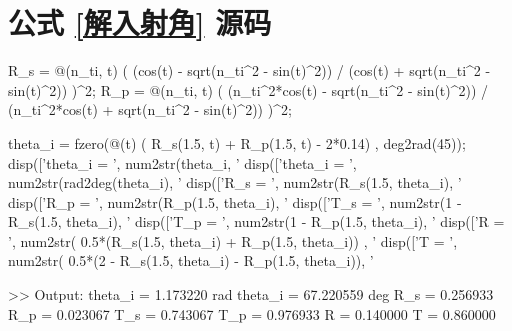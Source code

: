 \documentclass[UTF8]{report}
\theoremstyle{MyLineTheoremStyle} %
\theoremstyle{MyBlockTheoremStyle} %
\theoremstyle{MySubsubsectionStyle} %
\begin{document}
\section{公式 \ref{解入射角} 源码}\label{公式解入射角源码}

\begin{matlablisting}
R_s = @(n_ti, t) ( (cos(t) - sqrt(n_ti^2 - sin(t)^2)) / (cos(t) + sqrt(n_ti^2 - sin(t)^2)) )^2;
R_p = @(n_ti, t) ( (n_ti^2*cos(t) - sqrt(n_ti^2 - sin(t)^2)) / (n_ti^2*cos(t) + sqrt(n_ti^2 - sin(t)^2)) )^2;

theta_i = fzero(@(t) ( R_s(1.5, t) + R_p(1.5, t) - 2*0.14) , deg2rad(45));
disp(['theta_i = ', num2str(theta_i, '%
disp(['theta_i = ', num2str(rad2deg(theta_i), '%
disp(['R_s = ', num2str(R_s(1.5, theta_i), '%
disp(['R_p = ', num2str(R_p(1.5, theta_i), '%
disp(['T_s = ', num2str(1 - R_s(1.5, theta_i), '%
disp(['T_p = ', num2str(1 - R_p(1.5, theta_i), '%
disp(['R = ', num2str( 0.5*(R_s(1.5, theta_i) + R_p(1.5, theta_i)) , '%
disp(['T = ', num2str( 0.5*(2 - R_s(1.5, theta_i) - R_p(1.5, theta_i)), '%

>> Output:
theta_i = 1.173220 rad
theta_i = 67.220559 deg
R_s = 0.256933
R_p = 0.023067
T_s = 0.743067
T_p = 0.976933
R = 0.140000
T = 0.860000
\end{matlablisting}

\end{document}
